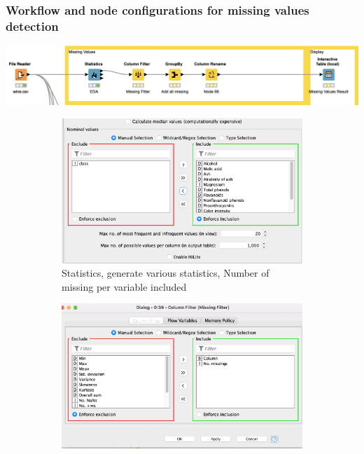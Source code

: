 \documentclass[11pt]{article}
\begin{document}
			\subsubsection*{Workflow and node configurations for missing values detection}
			\iftrue
			\begin{center}
				\includegraphics[scale=0.5]{res/t0/t01/t01-workflow}
			\end{center}
			\fi
			\iftrue
			\begin{figure}[H]
				\centering
				\begin{subfigure}{0.4\textwidth}
					\includegraphics[width=\textwidth]{res/t0/t01/t01-statistics-conf}
					\caption{Statistics, generate various statistics, Number of missing per variable included}
					\label{fig:first}
				\end{subfigure}
				\hfill
				\begin{subfigure}{0.4\textwidth}
					\includegraphics[width=\textwidth]{res/t0/t01/t01-column-filter-conf}

\end{subfigure}
\end{figure}
\end{document}
